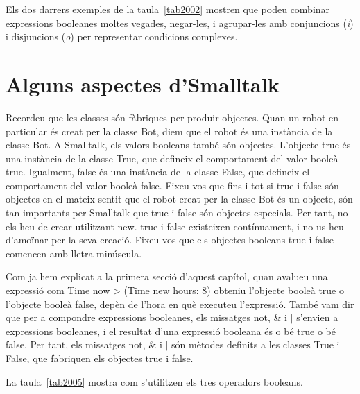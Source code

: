 Els dos darrers exemples de la taula~\ref{tab2002} mostren que podeu combinar expressions booleanes moltes vegades, negar-les, i agrupar-les amb conjuncions (\emph{i}) i disjuncions (\emph{o}) per representar condicions complexes. 

\section{Alguns aspectes d'Smalltalk}
Recordeu que les classes són fàbriques per produir objectes. Quan un robot en particular és creat per la classe \textsf{Bot}, diem que el robot és una instància de la classe \textsf{Bot}. A Smalltalk, els valors booleans també són objectes. L'objecte \textsf{true} és una instància de la classe \textsf{True}, que defineix el comportament del valor booleà \textsf{true}. Igualment, \textsf{false} és una instància de la classe \textsf{False}, que defineix el comportament del valor booleà \textsf{false}. Fixeu-vos que fins i tot si 
\textsf{true} i \textsf{false} són objectes en el mateix sentit que el robot creat per la classe \textsf{Bot} és un objecte, són tan importants per Smalltalk que \textsf{true} i \textsf{false} són objectes especials. Per tant, no els heu de crear utilitzant \textsf{new}. \textsf{true} i \textsf{false} existeixen contínuament, i no us heu d'amoïnar per la seva creació. Fixeu-vos que els objectes booleans \textsf{true} i \textsf{false} comencen amb lletra minúscula.

Com ja hem explicat a la primera secció d'aquest capítol, quan avalueu una expressió com \textsf{Time now \textgreater \hspace*{1mm} (Time new hours: 8)} obteniu  l'objecte booleà \textsf{true} o l'objecte booleà \textsf{false}, depèn de l'hora en què executeu l'expressió. També vam dir que per a compondre expressions booleanes, els missatges \textsf{not}, \textsf{\&} i \textsf{$|$} s'envien a expressions booleanes, i el resultat d'una expressió booleana és o bé \textsf{true} o bé \textsf{false}. Per tant, els missatges \textsf{not}, \textsf{\&} i \textsf{$|$} són mètodes definits a les classes \textsf{True} i \textsf{False}, que fabriquen els objectes \textsf{true} i \textsf{false}.

La taula~\ref{tab2005} mostra com s'utilitzen els tres operadors booleans.  

